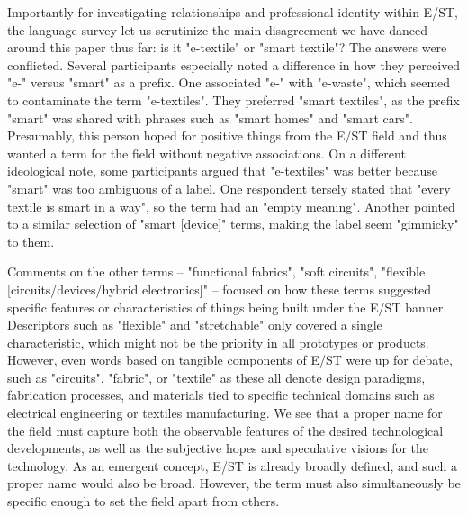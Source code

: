 \documentclass[manuscript,review,anonymous]{acmart}
\begin{document}
Importantly for investigating relationships and professional identity within E/ST, the language survey let us scrutinize the main disagreement we have danced around this paper thus far: is it "e-textile" or "smart textile"? The answers were conflicted. Several participants especially noted a difference in how they perceived "e-" versus "smart" as a prefix. One associated "e-" with "e-waste", which seemed to contaminate the term "e-textiles". They preferred "smart textiles", as the prefix "smart" was shared with phrases such as "smart homes" and "smart cars". Presumably, this person hoped for positive things from the E/ST field and thus wanted a term for the field without negative associations. On a different ideological note, some participants argued that "e-textiles" was better because "smart" was too ambiguous of a label. One respondent tersely stated that "every textile is smart in a way", so the term had an "empty meaning". Another pointed to a similar selection of "smart [device]" terms, making the label seem "gimmicky" to them. 

Comments on the other terms -- "functional fabrics", "soft circuits", "flexible [circuits/devices/hybrid electronics]" -- focused on how these terms suggested specific features or characteristics of things being built under the E/ST banner. Descriptors such as "flexible" and "stretchable" only covered a single characteristic, which might not be the priority in all prototypes or products. However, even words based on tangible components of E/ST were up for debate, such as "circuits", "fabric", or "textile" as these all denote design paradigms, fabrication processes, and materials tied to specific technical domains such as electrical engineering or textiles manufacturing. We see that a proper name for the field must capture both the observable features of the desired technological developments, as well as the subjective hopes and speculative visions for the technology. As an emergent concept, E/ST is already broadly defined, and such a proper name would also be broad. However, the term must also simultaneously be specific enough to set the field apart from others.

\end{document}
